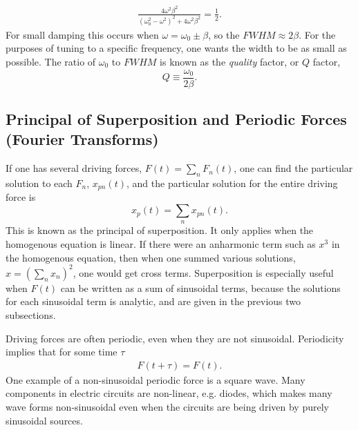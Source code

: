 \begin{eqnarray}
\frac{4\omega^2\beta^2}{(\omega_0^2-\omega^2)^2+4\omega^2\beta^2}=\frac{1}{2}.
\end{eqnarray}
For small damping this occurs when $\omega=\omega_0\pm \beta$, so the $FWHM\approx 2\beta$. For the purposes of tuning to a specific frequency, one wants the width to be as small as possible. The ratio of $\omega_0$ to $FWHM$ is known as the {\it quality} factor, or $Q$ factor,
\begin{equation}
Q\equiv \frac{\omega_0}{2\beta}.
\end{equation}

\subsection{Principal of Superposition and Periodic Forces (Fourier Transforms)}

If one has several driving forces, $F(t)=\sum_n F_n(t)$, one can find the particular solution to each $F_n$, $x_{pn}(t)$, and the particular solution for the entire driving force is 
\begin{equation}
x_p(t)=\sum_nx_{pn}(t).
\end{equation}
This is known as the principal of superposition. It only applies when the homogenous equation is linear. If there were an anharmonic term such as $x^3$ in the homogenous equation, then when one summed various solutions, $x=(\sum_n x_n)^2$, one would get cross terms. Superposition is especially useful when $F(t)$ can be written as a sum of sinusoidal terms, because the solutions for each sinusoidal term is analytic, and are given in the previous two subsections. 

Driving forces are often periodic, even when they are not sinusoidal. Periodicity implies that for some time $\tau$
\begin{eqnarray}
F(t+\tau)=F(t). 
\end{eqnarray}
One example of a non-sinusoidal periodic force is a square wave. Many components in electric circuits are non-linear, e.g. diodes, which makes many wave forms non-sinusoidal even when the circuits are being driven by purely sinusoidal sources.


